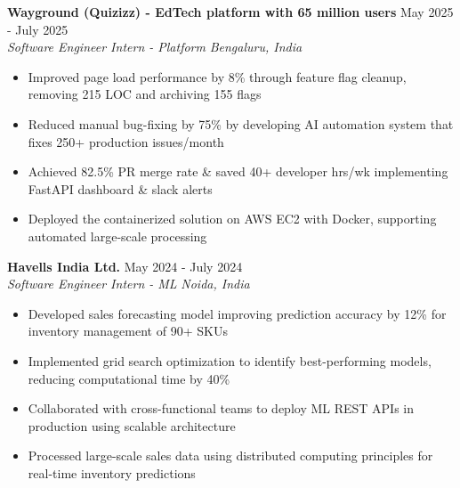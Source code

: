 \documentclass[a4paper]{article}
\newcommand{\bulletSep} { \vspace{1.5mm} }
\newcommand{\experienceItem}[5]{
    \textbf{#1} \hfill #2 \\
    \textit{#3} \hfill \textit{#4} \\
    #5
}
\begin{document}
\experienceItem{Wayground (Quizizz) - EdTech platform with 65 million users}{May 2025 - July 2025}{Software
Engineer Intern - Platform}{Bengaluru, India}{
    \begin{itemize}
    \item Improved page load performance by 8\% through feature flag cleanup, removing 215 LOC and archiving 155 flags
    \item Reduced manual bug-fixing by 75\% by developing AI automation system that fixes 250+ production issues/month
    \item Achieved 82.5\% PR merge rate \& saved 40+ developer hrs/wk implementing FastAPI dashboard \& slack alerts 
    

    \item Deployed the containerized solution on AWS EC2 with Docker, supporting automated large-scale processing
    \end{itemize}
}
\bulletSep

\experienceItem{Havells India Ltd.}{May 2024 - July 2024}{Software Engineer Intern - ML}{Noida, India}{
\begin{itemize}
    \item Developed sales forecasting model improving prediction accuracy by 12\% for inventory management of 90+ SKUs
    \item Implemented grid search optimization to identify best-performing models, reducing computational time by 40\%
    \item Collaborated with cross-functional teams to deploy ML REST APIs in production using scalable architecture
    \item Processed large-scale sales data using distributed computing principles for real-time inventory predictions

\end{itemize}
}
\end{document}
